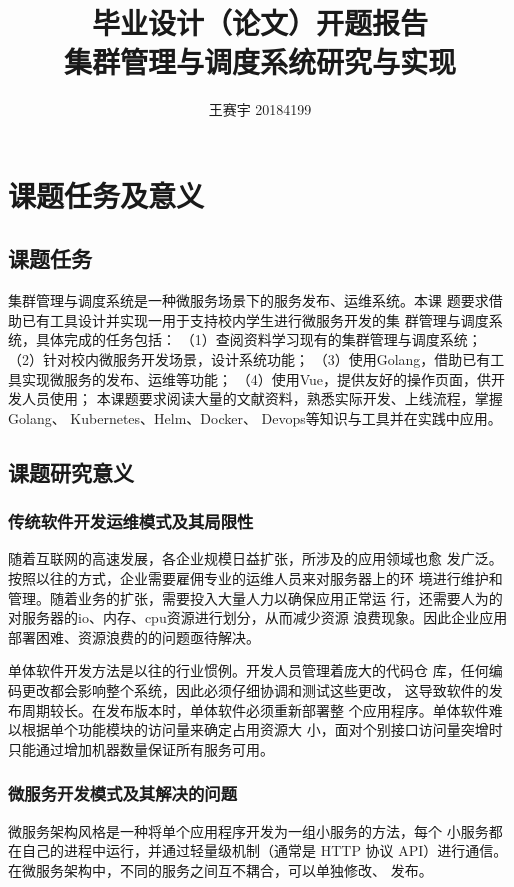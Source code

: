 \documentclass{article}
\title{毕业设计（论文）开题报告\protect\\集群管理与调度系统研究与实现}
\author{王赛宇 20184199}
\begin{document}
\maketitle

\section{课题任务及意义}

\subsection{课题任务}
  集群管理与调度系统是一种微服务场景下的服务发布、运维系统。本课
题要求借助已有工具设计并实现一用于支持校内学生进行微服务开发的集
群管理与调度系统，具体完成的任务包括：
    （1）查阅资料学习现有的集群管理与调度系统；
    （2）针对校内微服务开发场景，设计系统功能；
    （3）使用Golang，借助已有工具实现微服务的发布、运维等功能；
    （4）使用Vue，提供友好的操作页面，供开发人员使用；
  本课题要求阅读大量的文献资料，熟悉实际开发、上线流程，掌握Golang、
Kubernetes\cite{kubernetes}、Helm、Docker\cite{dockerContainer}、
Devops\cite{devopsForDeveloper}等知识与工具并在实践中应用。

\subsection{课题研究意义}

\subsubsection{传统软件开发运维模式及其局限性}
  随着互联网的高速发展，各企业规模日益扩张，所涉及的应用领域也愈
发广泛。按照以往的方式，企业需要雇佣专业的运维人员来对服务器上的环
境进行维护和管理。随着业务的扩张，需要投入大量人力以确保应用正常运
行，还需要人为的对服务器的io、内存、cpu资源进行划分，从而减少资源
浪费现象。因此企业应用部署困难、资源浪费的的问题亟待解决。\cite{cloudExtend}

  单体软件开发方法是以往的行业惯例。开发人员管理着庞大的代码仓
库，任何编码更改都会影响整个系统，因此必须仔细协调和测试这些更改\cite{cloudNativeVSMonolithicApplications}，
这导致软件的发布周期较长。在发布版本时，单体软件必须重新部署整
个应用程序。单体软件难以根据单个功能模块的访问量来确定占用资源大
小，面对个别接口访问量突增时只能通过增加机器数量保证所有服务可用。

\subsubsection{微服务开发模式及其解决的问题}
  微服务架构风格是一种将单个应用程序开发为一组小服务的方法，每个
小服务都在自己的进程中运行，并通过轻量级机制（通常是 HTTP 协议 
API）进行通信\cite{microservicesSummary}。在微服务架构中，不同的服务之间互不耦合，可以单独修改、
发布。
\end{document}
